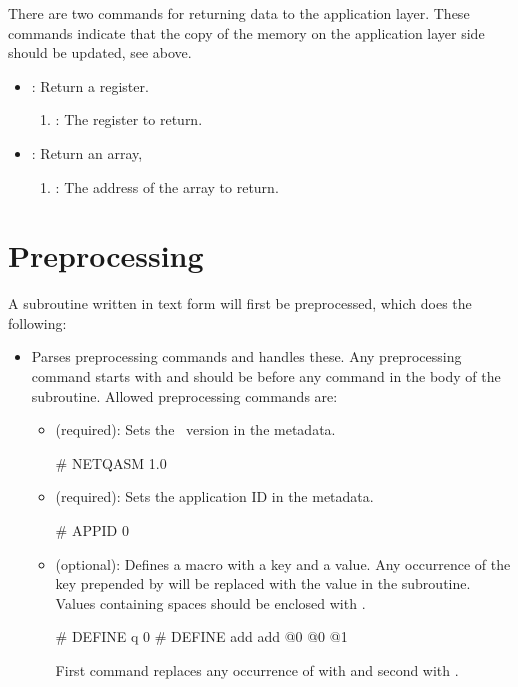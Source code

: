 There are two commands for returning data to the application layer.
These commands indicate that the copy of the memory on the application layer side should be updated, see above.
\begin{itemize}
  \item {}: Return a register.
        \begin{enumerate}
          \item \REGISTER: The register to return.
        \end{enumerate}
  \item {}: Return an array,
        \begin{enumerate}
          \item \ADDRESS: The address of the array to return.
        \end{enumerate}
\end{itemize}

\section{Preprocessing}
A subroutine written in text form will first be preprocessed, which does the following:
\begin{itemize}
  \item Parses preprocessing commands and handles these.
        Any preprocessing command starts with \nq{#} and should be before any command in the body of the subroutine.
        Allowed preprocessing commands are:
        \begin{itemize}
          \item \netqasm (required): Sets the \netqasm\ version in the metadata.
                \begin{nqcode}
# NETQASM 1.0\end{nqcode}
          \item {} (required): Sets the application ID in the metadata.
                \begin{nqcode}
# APPID 0\end{nqcode}
          \item {} (optional): Defines a macro with a key and a value.
                Any occurrence of the key prepended by \nq{\$} will be replaced with the value in the subroutine.
                Values containing spaces should be enclosed with \nq{\{\}}.

                \begin{nqcode}
# DEFINE q 0
# DEFINE add {add @0 @0 @1}\end{nqcode}
                First command replaces any occurrence of  with  and second  with .
        \end{itemize}
\end{itemize}


